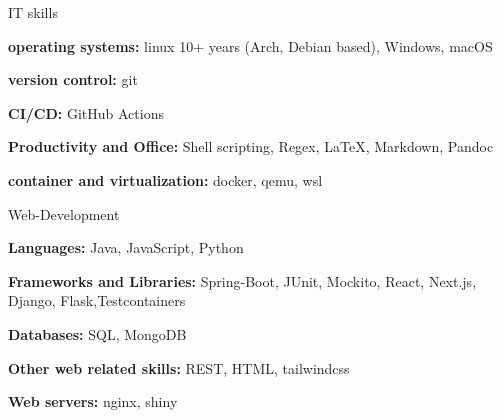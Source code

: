 

\begin{cvskills}
  \cvskill
    {IT skills} %
    {
      \begin{cvitems}
        \item {\textbf{operating systems:} linux 10+ years (Arch, Debian based), Windows, macOS}
        \item {\textbf{version control:} git}
        \item {\textbf{CI/CD:} GitHub Actions}
        \item {\textbf{Productivity and Office:} Shell scripting, Regex, LaTeX, Markdown, Pandoc}
        \item {\textbf{container and virtualization:} docker, qemu, wsl}
      \end{cvitems}
      }
\cvskill
{Web-Development}%
{
  \begin{cvitems}
    \item {\textbf{Languages:} Java, JavaScript, Python}
    \item {\textbf{Frameworks and Libraries:} Spring-Boot, JUnit, Mockito, React, Next.js, Django, Flask,\newline Testcontainers}
    \item {\textbf{Databases:} SQL, MongoDB}
    \item {\textbf{Other web related skills:} REST, HTML, tailwindcss}
    \item {\textbf{Web servers:} nginx, shiny}
  \end{cvitems}
}


\end{cvskills}
